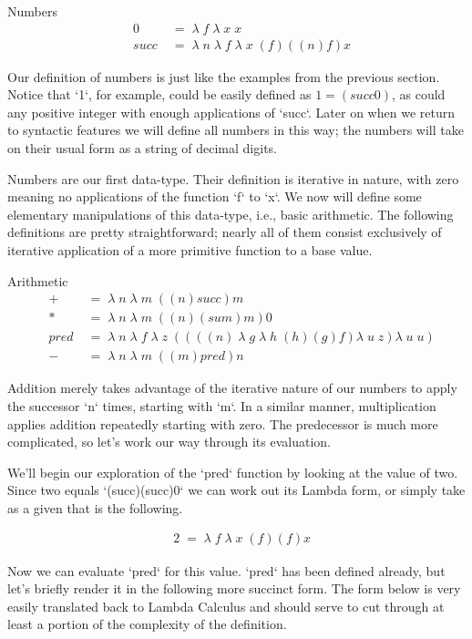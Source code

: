 \documentclass[11pt]{article}
\begin{document}
Numbers
\begin{align*}
& 0 \; &= \; \lambda \; f \; \lambda \; x \; x
\\& succ \; &= \; \lambda \; n \; \lambda \; f \; \lambda \; x \; (f)((n)f)x
\end{align*}

Our definition of numbers is just like the examples from the previous section. Notice that `1`, for example, could be easily defined as $1 = (succ 0)$, as could any positive integer with enough applications of `succ`. Later on when we return to syntactic features we will define all numbers in this way; the numbers will take on their usual form as a string of decimal digits.

Numbers are our first data-type. Their definition is iterative in nature, with zero meaning no applications of the function `f` to `x`. We now will define some elementary manipulations of this data-type, i.e., basic arithmetic. The following definitions are pretty straightforward; nearly all of them consist exclusively of iterative application of a more primitive function to a base value.

Arithmetic
\begin{align*}
& + \; &= \; \lambda \; n \; \lambda \; m \; ((n)succ)m
\\& * \; &= \; \lambda \; n \; \lambda \; m \; ((n)(sum)m)0
\\& pred \; &= \; \lambda \; n \; \lambda \; f \; \lambda \; z \; ((((n) \; \lambda \; g \; \lambda \; h \; (h)(g)f)\lambda \; u \; z)\lambda \; u \; u)
\\& - \; &= \; \lambda \; n \; \lambda \; m \; ((m)pred)n
\end{align*}

Addition merely takes advantage of the iterative nature of our numbers to apply the successor `n` times, starting with `m`. In a similar manner, multiplication applies addition repeatedly starting with zero. The predecessor is much more complicated, so let's work our way through its evaluation.

We'll begin our exploration of the `pred` function by looking at the value of two. Since two equals `(succ)(succ)0` we can work out its Lambda form, or simply take as a given that is the following.

\begin{align*}
& 2 \; = \; \lambda \; f \; \lambda \; x \; (f)(f)x
\end{align*}

Now we can evaluate `pred` for this value. `pred` has been defined already, but let's briefly render it in the following more succinct form. The form below is very easily translated back to Lambda Calculus and should serve to cut through at least a portion of the complexity of the definition.
\end{document}
